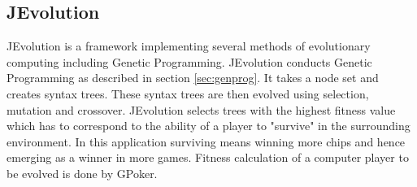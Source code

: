 \documentclass[12pt,fleqn,a4paper]{article}
\begin{document}
\subsection{JEvolution}
JEvolution is a framework implementing several methods of evolutionary computing including Genetic Programming. JEvolution
conducts Genetic Programming as described in section \ref{sec:genprog}. It takes a node set and creates syntax trees. These
syntax trees are then evolved using selection, mutation and crossover. JEvolution selects trees with the highest fitness value which has to correspond to the ability of a player to "survive" in the surrounding environment.
In this application surviving means winning more chips and hence emerging as a winner in more games. Fitness calculation of a computer player to be evolved is done by GPoker. 

\label{gpocker}
\end{document}
